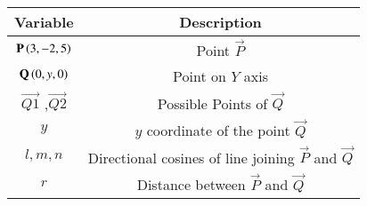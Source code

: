 \begin{tabular}[12pt]{ |c| c|}
    \hline
    \textbf{Variable} & \textbf{Description}\\ 
    \hline
	$\mathbf{P}\left(3,-2,5\right)$ & Point $\vec{P}$ \\
    \hline 
	$\mathbf{Q}\left(0,y,0\right)$ & Point on $Y$ axis  \\
    \hline
	$\vec{Q1}$ ,$\vec{Q2}$ & Possible Points of $\vec{Q}$\\
    \hline
	$y$ & $y$ coordinate of the point $\vec{Q}$\\
    \hline
	$l,m,n$ & Directional cosines of line joining $\vec{P}$ and $\vec{Q}$\\
    \hline
	$r$ & Distance between $\vec{P}$ and $\vec{Q}$\\
    \hline	
\end{tabular}
